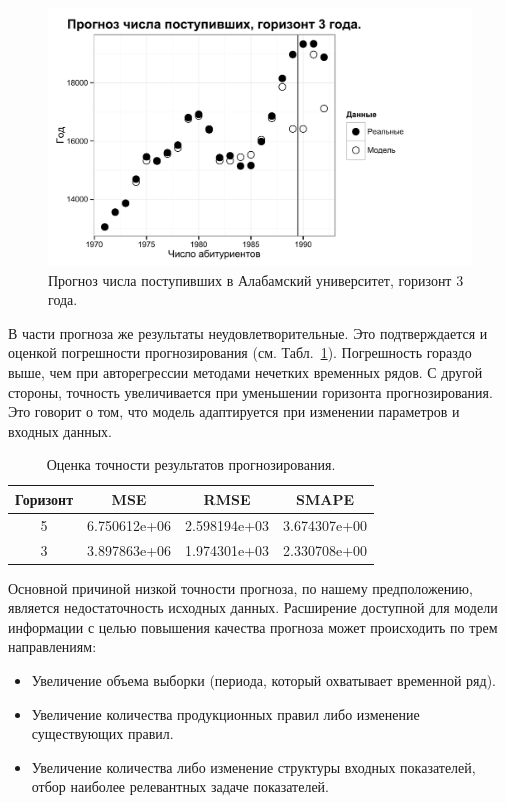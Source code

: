 \begin{figure}[bhtp]
	\begin{center}
		\includegraphics{images/UA_model_h=3.pdf}
		\caption{Прогноз числа поступивших в Алабамский университет, \newline горизонт 3 года.}		
		\label{figure:UA_model_h=3}
	\end{center}
\end{figure}

В части прогноза же результаты неудовлетворительные. Это подтверждается и оценкой погрешности прогнозирования (см. Табл.~\ref{table:WM-error}). Погрешность гораздо выше, чем при авторегрессии методами нечетких временных рядов. С другой стороны, точность увеличивается при уменьшении горизонта прогнозирования. Это говорит о том, что модель адаптируется при изменении параметров и входных данных. 

\begin{table}[bhtp]
	\caption{Оценка точности результатов прогнозирования.}
	\begin{center}
		\begin{tabular}{ | c | c | c | c | }
			\hline
			Горизонт & MSE & RMSE & SMAPE \\
			\hline
			5 & 6.750612e+06 & 2.598194e+03 & 3.674307e+00  \\
			\hline
			3 & 3.897863e+06 & 1.974301e+03 & 2.330708e+00  \\
			\hline
		\end{tabular}		
	\end{center}
	\label{table:WM-error}	
\end{table}

Основной причиной низкой точности прогноза, по нашему предположению, является недостаточность исходных данных. Расширение доступной для модели информации с целью повышения качества прогноза может происходить по трем направлениям:
\begin{itemize}
	\item Увеличение объема выборки (периода, который охватывает временной ряд).
	\item Увеличение количества продукционных правил либо изменение существующих правил.
	\item Увеличение количества либо изменение структуры входных показателей, отбор наиболее релевантных задаче показателей.
\end{itemize}

